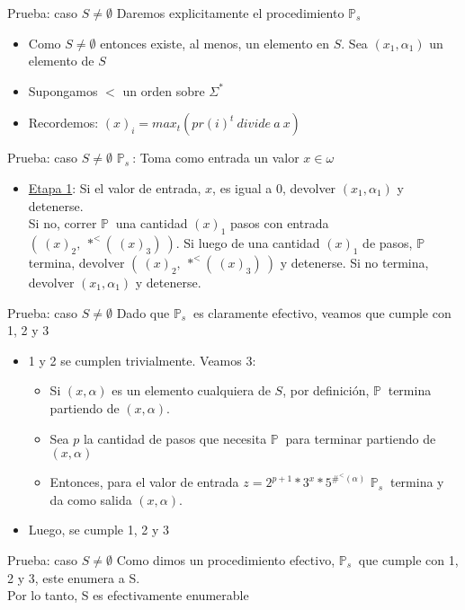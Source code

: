 \documentclass[10pt]{beamer}
\newcommand{\p}{\mathbb{P}}
\begin{document}
\begin{frame}{Prueba: caso $S \neq \emptyset$}
  Daremos explicitamente el procedimiento $\p_{s}\ $
  \begin{itemize}[<+->]
    \item Como $S \neq \emptyset$ entonces existe, al menos, un elemento en $S$.
    Sea $(x_{1}, \alpha_{1})$ un elemento de $S$
    \item Supongamos $<$ un orden sobre $\Sigma^{*}$
    \item Recordemos: $(x)_{i} = max_{t}(pr(i)^{t}\ divide\ a\ x)$
  \end{itemize}

\end{frame}



\begin{frame}{Prueba: caso $S \neq \emptyset$}
  \underline{$\p_{s}\ $}: Toma como entrada un valor $x \in \omega$
  \begin{itemize}[<+->]
    \item[ ] \underline{Etapa 1}: Si el valor de entrada, $x$, es igual a $0$,
    devolver $(x_{1}, \alpha_{1})$ y detenerse. \\
    Si no, correr $\p\ $ una cantidad $(x)_{1}$ pasos con entrada
    $(\ (x)_{2},\ *^{<}(\ (x)_{3})\ )$. Si luego de una cantidad $(x)_{1}$
    de pasos, $\p\ $ termina, devolver $(\ (x)_{2},\ *^{<}(\ (x)_{3})\ )$ y
    detenerse. Si no termina, devolver $(x_{1}, \alpha_{1})$ y detenerse.

  \end{itemize}
\end{frame}

\begin{frame}{Prueba: caso $S \neq \emptyset$}
  Dado que $\p_{s}\ $ es claramente efectivo, veamos que cumple con 1, 2 y 3
  \begin{itemize}[<+->]
    \item 1 y 2 se cumplen trivialmente. Veamos 3:
    \begin{itemize}[<+->]
      \item Si $(x, \alpha)$ es un elemento cualquiera de $S$, por definición,
      $\p\ $ termina partiendo de $(x, \alpha)$.
      \item Sea $p$ la cantidad de pasos que necesita $\p\ $ para terminar partiendo
      de $(x, \alpha)$
      \item Entonces, para el valor de entrada
      $z = 2^{p+1} * 3^{x} * 5^{\#^{<}(\alpha)}$ $\p_{s}\ $ termina y da como salida
      $(x, \alpha)$.
    \end{itemize}
    \item Luego, se cumple 1, 2 y 3
  \end{itemize}

\end{frame}


\begin{frame}{Prueba: caso $S \neq \emptyset$}
  Como dimos un procedimiento efectivo, $\p_{s}\ $ que cumple con 1, 2 y 3, este
  enumera a S. \\
  Por lo tanto, S es efectivamente enumerable
\end{frame}
\end{document}
